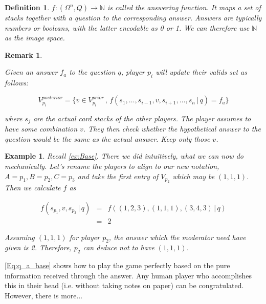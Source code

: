 \documentclass{article}
\newtheorem{definition}{Definition}[section]
\newtheorem{remark}{Remark}[section]
\newtheorem{example}{Example}[section]
\begin{document}
\begin{definition}

$f: \left( \Omega^n, Q \right) \longrightarrow \mathbb{N}$ is called the answering function. It maps a set of stacks together with a question to the corresponding answer. Answers are typically numbers or booleans, with the latter encodable as 0 or 1. We can therefore use $\mathbb{N}$ as the image space.

\end{definition}

\begin{remark}\label{rem:AnswerAnalysis}

Given an answer $f_a$ to the question $q$, player $p_i$ will update their valids set as follows:

\begin{equation}
V_{p_i}^{posterior} = \{ v \in V_{p_i}^{prior} \, , \, f(s_1, \ldots, s_{i-1}, v, s_{i+1}, \ldots, s_n \, | \, q) = f_a \}
\label{Eq:q_a_base}
\end{equation}

where $s_j$ are the actual card stacks of the other players. The player assumes to have some combination $v$. They then check whether the hypothetical answer to the question would be the same as the actual answer. Keep only those $v$.

\end{remark}

\begin{example}

Recall \cref{ex:Base}. There we did intuitively, what we can now do mechanically. Let's rename the players to align to our new notation, $A = p_1, B = p_2, C = p_3$ and take the first entry of $V_{p_2}$ which may be $(1, 1, 1)$. Then we calculate $f$ as

\begin{eqnarray*}
f(s_{p_1}, v, s_{p_3} \, | \, q) &=& f((1, 2, 3), (1,1,1), (3, 4, 3) \, | \, q) \\
&=& 2
\end{eqnarray*}

Assuming $(1, 1, 1)$ for player $p_2$, the answer which the moderator need have given is 2. Therefore, $p_2$ can deduce not to have $(1, 1, 1)$. 

\end{example}

\cref{Eq:q_a_base} shows how to play the game perfectly based on the pure information received through the answer. Any human player who accomplishes this in their head (i.e. without taking notes on paper) can be congratulated. However, there is more...
\end{document}
